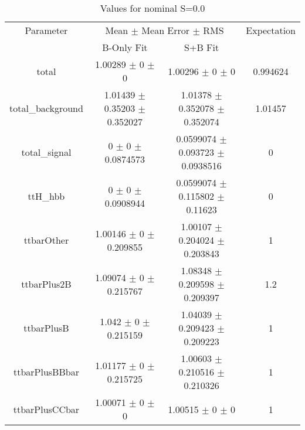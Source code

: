 \begin{table}
\centering
\caption{Values for nominal S=0.0}
\begin{tabular}{cccc}
\toprule
Parameter & \multicolumn{2}{c}{Mean $\pm$ Mean Error $\pm$ RMS} & Expectation\\
 & B-Only Fit & S+B Fit & \\
\midrule
total & \num{1.00289} $\pm$ \num{0} $\pm$ \num{0} & \num{1.00296} $\pm$ \num{0} $\pm$ \num{0} & \num{0.994624}\\
total\_background & \num{1.01439} $\pm$ \num{0.35203} $\pm$ \num{0.352027} & \num{1.01378} $\pm$ \num{0.352078} $\pm$ \num{0.352074} & \num{1.01457}\\
total\_signal & \num{0} $\pm$ \num{0} $\pm$ \num{0.0874573} & \num{0.0599074} $\pm$ \num{0.093723} $\pm$ \num{0.0938516} & \num{0}\\
ttH\_hbb & \num{0} $\pm$ \num{0} $\pm$ \num{0.0908944} & \num{0.0599074} $\pm$ \num{0.115802} $\pm$ \num{0.11623} & \num{0}\\
ttbarOther & \num{1.00146} $\pm$ \num{0} $\pm$ \num{0.209855} & \num{1.00107} $\pm$ \num{0.204024} $\pm$ \num{0.203843} & \num{1}\\
ttbarPlus2B & \num{1.09074} $\pm$ \num{0} $\pm$ \num{0.215767} & \num{1.08348} $\pm$ \num{0.209598} $\pm$ \num{0.209397} & \num{1.2}\\
ttbarPlusB & \num{1.042} $\pm$ \num{0} $\pm$ \num{0.215159} & \num{1.04039} $\pm$ \num{0.209423} $\pm$ \num{0.209223} & \num{1}\\
ttbarPlusBBbar & \num{1.01177} $\pm$ \num{0} $\pm$ \num{0.215725} & \num{1.00603} $\pm$ \num{0.210516} $\pm$ \num{0.210326} & \num{1}\\
ttbarPlusCCbar & \num{1.00071} $\pm$ \num{0} $\pm$ \num{0} & \num{1.00515} $\pm$ \num{0} $\pm$ \num{0} & \num{1}\\
\bottomrule
\end{tabular}
\end{table}